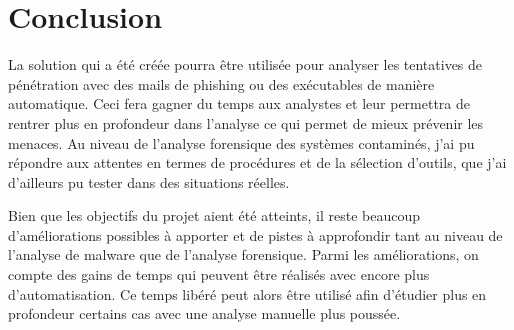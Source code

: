 
\chapter{Conclusion}

La solution qui a été créée pourra être utilisée pour analyser les tentatives de pénétration avec des mails de phishing ou des exécutables de manière automatique. Ceci fera gagner du temps aux analystes et leur permettra de rentrer plus en profondeur dans l'analyse ce qui permet de mieux prévenir les menaces. Au niveau de l’analyse forensique des systèmes contaminés, j’ai pu répondre aux attentes en termes de procédures et de la sélection d’outils, que j’ai d’ailleurs pu tester dans des situations réelles.

Bien que les objectifs du projet aient été atteints, il reste beaucoup d'améliorations possibles à apporter et de pistes à approfondir tant au niveau de l'analyse de malware que de l'analyse forensique. Parmi les améliorations, on compte des gains de temps qui peuvent être réalisés avec encore plus d'automatisation. Ce temps libéré peut alors être utilisé afin d'étudier plus en profondeur certains cas avec une analyse manuelle plus poussée.

